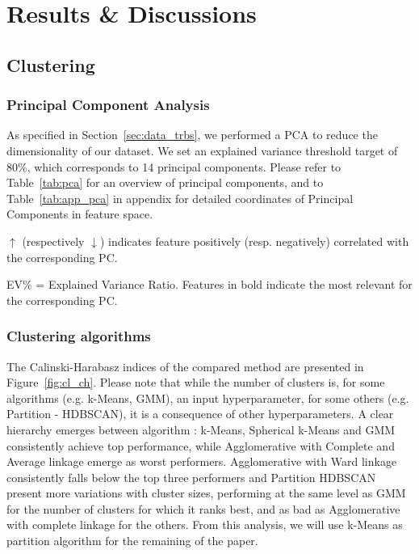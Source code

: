 \section{Results \& Discussions}
\label{sec:results}

\subsection{Clustering}

\subsubsection{Principal Component Analysis}

As specified in Section~\ref{sec:data_trbs}, we performed a PCA to reduce the dimensionality of our dataset. 
We set an explained variance threshold target of 80\%, which corresponds to 14 principal components.
Please refer to Table~\ref{tab:pca} for an overview of principal components, and to Table~\ref{tab:app_pca} in appendix for detailed coordinates of Principal Components in feature space.

\begin{table}
  \tiny
  \caption{Principal Component details}
  \label{tab:pca}
  
  {\raggedright \small $\uparrow$ (respectively $\downarrow$) indicates feature positively (resp. negatively) correlated with the corresponding PC. 
  
  EV\% = Explained Variance Ratio.  
  Features in bold indicate the most relevant for the corresponding PC.}
\end{table}


\subsubsection{Clustering algorithms}

The Calinski-Harabasz indices of the compared method are presented in Figure~\ref{fig:cl_ch}.
Please note that while the number of clusters is, for some algorithms (e.g. k-Means, GMM), an input hyperparameter, for some others (e.g. Partition - HDBSCAN), it is a consequence of other hyperparameters.
A clear hierarchy emerges between algorithm : k-Means, Spherical k-Means and GMM consistently achieve top performance, while Agglomerative with Complete and Average linkage emerge as worst performers.
Agglomerative with Ward linkage consistently falls below the top three performers and Partition HDBSCAN present more variations with cluster sizes, performing at the same level as GMM for the number of clusters for which it ranks best, and as bad as Agglomerative with complete linkage for the others.
From this analysis, we will use k-Means as partition algorithm for the remaining of the paper.

